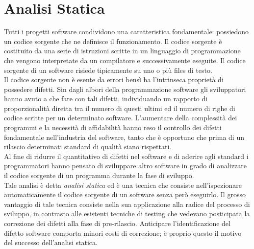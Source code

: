 \chapter{Analisi Statica}

\begin{epigraphs}
\end{epigraphs}

Tutti i progetti software condividono una caratteristica fondamentale: possiedono un codice sorgente che ne definisce il funzionamento. Il codice sorgente è costituito da una serie di istruzioni scritte in un linguaggio di programmazione che vengono interpretate da un compilatore e successivamente eseguite. Il codice sorgente di un software risiede tipicamente su uno o più files di testo.\\
Il codice sorgente non è esente da errori bensì ha l'intrinseca proprietà di possedere difetti. Sin dagli albori della programmazione software gli sviluppatori hanno avuto a che fare con tali difetti, individuando un rapporto di proporzionalità diretta tra il numero di questi ultimi ed il numero di righe di codice scritte per un determinato software. L'aumentare della complessità dei programmi e la necessità di affidabilità hanno reso il controllo dei difetti fondamentale nell'industria del software, tanto che è opportuno che prima di un rilascio determinati standard di qualità siano rispettati. \\
Al fine di ridurre il quantitativo di difetti nel software e di aderire agli standard i programmatori hanno pensato di sviluppare altro software in grado di analizzare il codice sorgente di un programma durante la fase di sviluppo.\\
Tale analisi è detta \emph{analisi statica} ed è una tecnica che consiste nell'ispezionare automaticamente il codice sorgente di un software senza però eseguirlo. Il grosso vantaggio di tale tecnica consiste nella sua applicazione alla radice del processo di sviluppo, in contrasto alle esistenti tecniche di testing che vedevano posticipata la correzione dei difetti alla fase di pre-rilascio. Anticipare l'identificazione del difetto software comporta minori costi di correzione; è proprio questo il motivo del successo dell'analisi statica.

